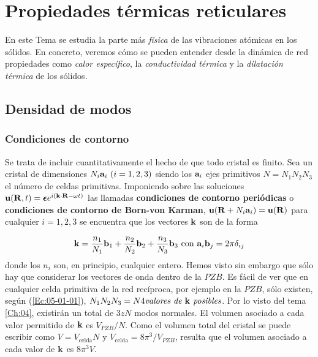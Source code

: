 \chapter{Propiedades térmicas reticulares} \label{Ch:05}

En este Tema se estudia la parte más \textit{física} de las vibraciones atómicas en los sólidos. En concreto, veremos cómo se pueden entender desde la dinámica de red propiedades como \textit{calor específico}, la \textit{conductividad térmica} y la \textit{dilatación térmica} de los sólidos.

\section{Densidad de modos}

\subsection{Condiciones de contorno}

Se trata de incluir cuantitativamente el hecho de que todo cristal es finito. Sea un cristal de dimensiones $N_i \mathbf{a}_i  \ (i=1,2,3)$ siendo los $\mathbf{a}_i$ ejes primitivos $N=N_1N_2N_3$ el número de celdas primitivas. Imponiendo sobre las soluciones $\mathbf{u}(\mathbf{R},t)= \boldsymbol{\epsilon} e^{i(\mathbf{k} \cdot \mathbf{R} - \omega t)}$ las llamadas \textbf{condiciones de contorno periódicas} o \textbf{condiciones de contorno de Born-von Karman}, $\mathbf{u}(\mathbf{R} + N_i \mathbf{a}_i) = \mathbf{u} (\mathbf{R})$ para cualquier $i=1,2,3$ se encuentra que los vectores $\mathbf{k}$ son de la forma

\begin{eqnarray}
	\mathbf{k} = \frac{n_1}{N_1} \mathbf{b}_1 + \frac{n_2}{N_2} \mathbf{b}_2 + \frac{n_3}{N_3} \mathbf{b}_3 \ \text{con} \ \mathbf{a}_i \mathbf{b}_j = 2 \pi \delta_{ij} \label{Ec:05-01-01}
\end{eqnarray}
donde los $n_i$ son, en principio, cualquier entero. Hemos visto sin embargo que sólo hay que considerar los vectores de onda dentro de la $PZB$. Es fácil de ver que en cualquier celda primitiva de la red recíproca, por ejemplo en la $PZB$, sólo existen, según (\ref{Ec:05-01-01}), $N_1N_2N_3=N4 \textit{valores de $\mathbf{k}$ posibles}$. Por lo visto del tema \ref{Ch:04}, existirán un total de $3zN$ modos normales. El volumen asociado a cada valor permitido de $\mathbf{k}$ es $V_{PZB}/N$. Como el volumen total del cristal se puede escribir como $V=V_{\text{celda}} N$ y $V_{\text{celda}} = 8 \pi^3 /V_{PZB}$, resulta que el volumen asociado a cada valor de $\mathbf{k}$ es $8 \pi^3 V$.

